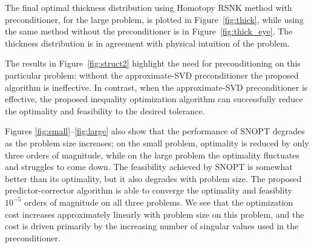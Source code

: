The final optimal thickness distribution using Homotopy RSNK method with preconditioner, 
for the large problem, is plotted in Figure~\ref{fig:thick}, while using the same method 
without the preconditioner is in Figure~\ref{fig:thick_eye}. 
The thickness distribution is in agreement with physical
intuition of the problem. 


The results in Figure~\ref{fig:struct2} highlight the need for preconditioning
on this particular problem: without the approximate-SVD preconditioner the
proposed algorithm is ineffective. 
In contrast, when the approximate-SVD preconditioner is effective, the
proposed inequality optimization algorithm can successfully reduce the optimality 
and feasibility to the desired tolerance.

Figures \ref{fig:small}--\ref{fig:large} also show that the performance of SNOPT
degrades as the problem size increases; on the small problem, optimality is
reduced by only three orders of magnitude, while on the large problem the optimality
fluctuates and struggles to come down.  The feasibility achieved by SNOPT is somewhat better
than its optimality, but it also degrades with problem size.  The proposed
predictor-corrector algorithm is able to converge the optimality and feasiblity
$10^{-5}$ orders of magnitude on all three problems. We see that the
optimization cost increases approximately linearly with problem size on this
problem, and the cost is driven primarily by the increasing number of singular values used
in the preconditioner. 

